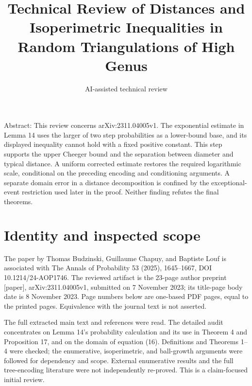 \documentclass[10pt]{article}
\title{Technical Review of Distances and Isoperimetric Inequalities in Random Triangulations of High Genus}
\author{AI-assisted technical review}
\date{}
\begin{document}
\maketitle
Abstract: This review concerns arXiv:2311.04005v1. The exponential estimate in Lemma 14 uses the larger of two step probabilities as a lower-bound base, and its displayed inequality cannot hold with a fixed positive constant. This step supports the upper Cheeger bound and the separation between diameter and typical distance. A uniform corrected estimate restores the required logarithmic scale, conditional on the preceding encoding and conditioning arguments. A separate domain error in a distance decomposition is confined by the exceptional-event restriction used later in the proof. Neither finding refutes the final theorems.\par
\section*{Identity and inspected scope}
The paper by Thomas Budzinski, Guillaume Chapuy, and Baptiste Louf is associated with The Annals of Probability 53 (2025), 1645–1667, DOI 10.1214/24-AOP1746. The reviewed artifact is the 23-page author preprint [paper], arXiv:2311.04005v1, submitted on 7 November 2023; its title-page body date is 8 November 2023. Page numbers below are one-based PDF pages, equal to the printed pages. Equivalence with the journal text is not asserted.\par
The full extracted main text and references were read. The detailed audit concentrates on Lemma 14’s probability calculation and its use in Theorem 4 and Proposition 17, and on the domain of equation (16). Definitions and Theorems 1–4 were checked; the enumerative, isoperimetric, and ball-growth arguments were followed for dependency and scope. External enumerative results and the full tree-encoding literature were not independently re-proved. This is a claim-focused initial review.\par
\end{document}
